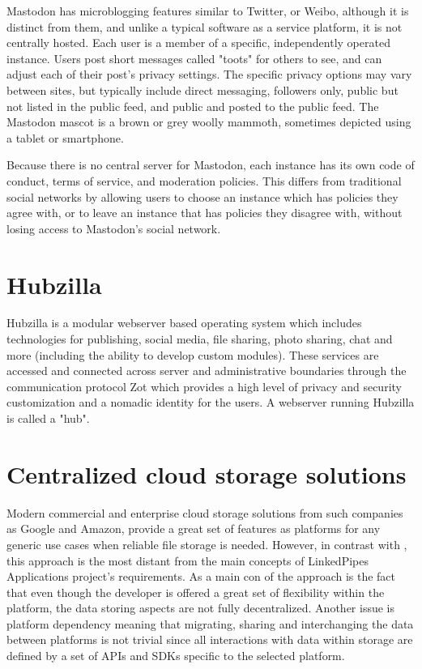 Mastodon has microblogging features similar to Twitter, or Weibo, although it is distinct from them, and unlike a typical software as a service platform, it is not centrally hosted. Each user is a member of a specific, independently operated instance. Users post short messages called "toots" for others to see, and can adjust each of their post's privacy settings. The specific privacy options may vary between sites, but typically include direct messaging, followers only, public but not listed in the public feed, and public and posted to the public feed. The Mastodon mascot is a brown or grey woolly mammoth, sometimes depicted using a tablet or smartphone.

Because there is no central server for Mastodon, each instance has its own code of conduct, terms of service, and moderation policies. This differs from traditional social networks by allowing users to choose an instance which has policies they agree with, or to leave an instance that has policies they disagree with, without losing access to Mastodon's social network.

\section{Hubzilla}

Hubzilla is a modular webserver based operating system which includes technologies for publishing, social media, file sharing, photo sharing, chat and more (including the ability to develop custom modules). These services are accessed and connected across server and administrative boundaries through the communication protocol Zot which provides a high level of privacy and security customization and a nomadic identity for the users. A webserver running Hubzilla is called a "hub".

\section{Centralized cloud storage solutions}

Modern commercial and enterprise cloud storage solutions from such companies as Google and Amazon, provide a great set of features as platforms for any generic use cases when reliable file storage is needed. However, in contrast with \solid{}, this approach is the most distant from the main concepts of LinkedPipes Applications project’s requirements. As a main con of the approach is the fact that even though the developer is offered a great set of flexibility within the platform, the data storing aspects are not fully decentralized. Another issue is platform dependency meaning that migrating, sharing and interchanging the data between platforms is not trivial since all interactions with data within storage are defined by a set of APIs and SDKs specific to the selected platform. 
